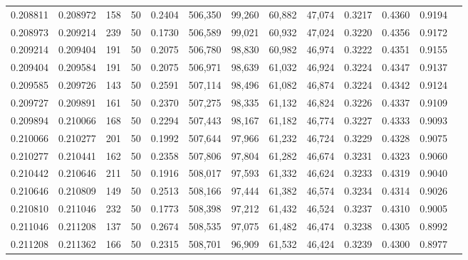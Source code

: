 \begin{tabular}{rrrrrrrrrrrrr}
0.208811 & 0.208972 &   158 &  50 &                                     0.2404 & 506,350 &  99,260 &  60,882 &  47,074 & 0.3217 & 0.4360 & 0.9194 \\
0.208973 & 0.209214 &   239 &  50 &                                     0.1730 & 506,589 &  99,021 &  60,932 &  47,024 & 0.3220 & 0.4356 & 0.9172 \\
0.209214 & 0.209404 &   191 &  50 &                                     0.2075 & 506,780 &  98,830 &  60,982 &  46,974 & 0.3222 & 0.4351 & 0.9155 \\
0.209404 & 0.209584 &   191 &  50 &                                     0.2075 & 506,971 &  98,639 &  61,032 &  46,924 & 0.3224 & 0.4347 & 0.9137 \\
0.209585 & 0.209726 &   143 &  50 &                                     0.2591 & 507,114 &  98,496 &  61,082 &  46,874 & 0.3224 & 0.4342 & 0.9124 \\
0.209727 & 0.209891 &   161 &  50 &                                     0.2370 & 507,275 &  98,335 &  61,132 &  46,824 & 0.3226 & 0.4337 & 0.9109 \\
0.209894 & 0.210066 &   168 &  50 &                                     0.2294 & 507,443 &  98,167 &  61,182 &  46,774 & 0.3227 & 0.4333 & 0.9093 \\
0.210066 & 0.210277 &   201 &  50 &                                     0.1992 & 507,644 &  97,966 &  61,232 &  46,724 & 0.3229 & 0.4328 & 0.9075 \\
0.210277 & 0.210441 &   162 &  50 &                                     0.2358 & 507,806 &  97,804 &  61,282 &  46,674 & 0.3231 & 0.4323 & 0.9060 \\
0.210442 & 0.210646 &   211 &  50 &                                     0.1916 & 508,017 &  97,593 &  61,332 &  46,624 & 0.3233 & 0.4319 & 0.9040 \\
0.210646 & 0.210809 &   149 &  50 &                                     0.2513 & 508,166 &  97,444 &  61,382 &  46,574 & 0.3234 & 0.4314 & 0.9026 \\
0.210810 & 0.211046 &   232 &  50 &                                     0.1773 & 508,398 &  97,212 &  61,432 &  46,524 & 0.3237 & 0.4310 & 0.9005 \\
0.211046 & 0.211208 &   137 &  50 &                                     0.2674 & 508,535 &  97,075 &  61,482 &  46,474 & 0.3238 & 0.4305 & 0.8992 \\
0.211208 & 0.211362 &   166 &  50 &                                     0.2315 & 508,701 &  96,909 &  61,532 &  46,424 & 0.3239 & 0.4300 & 0.8977 \\

\end{tabular}
